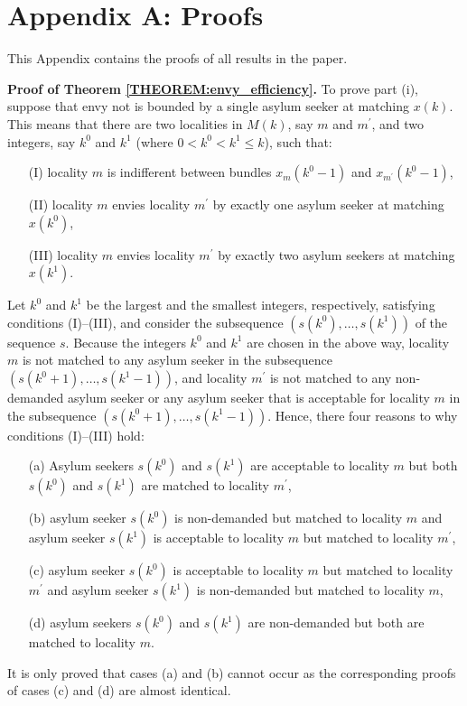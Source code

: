 \documentclass[12pt,fleqn]{article}
\begin{document}


\newpage

\section*{Appendix A: Proofs}
This Appendix contains the proofs of all results in the paper.

\medskip

\noindent\textbf{Proof of Theorem \ref{THEOREM:envy_efficiency}.} To prove part (i), suppose that envy not is bounded by a single asylum seeker at matching $x(k)$. This means that there are two localities in $M(k)$, say $m$ and $m^\prime$, and two integers, say $k^0$ and $k^1$ (where $0<k^0<k^1\leq k$), such that:
\begin{itemize}
\item[(I)] locality $m$ is indifferent between bundles $x_{m}(k^0-1)$ and $x_{m^\prime}(k^0-1)$,
\item[(II)] locality $m$ envies locality $m^\prime$ by exactly one asylum seeker at matching $x(k^0)$,
\item[(III)] locality $m$ envies locality $m^\prime$ by exactly two asylum seekers at matching $x(k^1)$.
\end{itemize}
\noindent Let $k^0$ and $k^1$ be the largest and the smallest integers, respectively, satisfying conditions (I)--(III), and consider the subsequence $(s(k^0),\ldots,s(k^1))$ of the sequence $s$. Because the integers $k^0$ and $k^1$ are chosen in the above way, locality $m$ is not matched to any asylum seeker in the subsequence $(s(k^0+1),\ldots,s(k^1-1))$, and
locality $m^\prime$ is not matched to any non-demanded asylum seeker or any asylum seeker that is acceptable for locality $m$ in the subsequence $(s(k^0+1),\ldots,s(k^1-1))$. Hence, there four reasons to why conditions (I)--(III) hold:
\begin{itemize}
\item[(a)] Asylum seekers $s(k^0)$ and $s(k^1)$ are acceptable to locality $m$ but both $s(k^0)$ and $s(k^1)$ are matched to locality $m^\prime$,
\item[(b)] asylum seeker $s(k^0)$ is non-demanded but matched to locality $m$ and asylum seeker $s(k^1)$ is acceptable to locality $m$ but matched to locality $m^\prime$,
\item[(c)] asylum seeker $s(k^0)$ is acceptable to locality $m$ but matched to locality $m^\prime$ and asylum seeker $s(k^1)$ is non-demanded but matched to locality $m$,
\item[(d)] asylum seekers $s(k^0)$ and $s(k^1)$ are non-demanded but both are matched to locality $m$.
\end{itemize}
\noindent It is only proved that cases (a) and (b) cannot occur as the corresponding proofs of cases (c) and (d) are almost identical.
\end{document}
